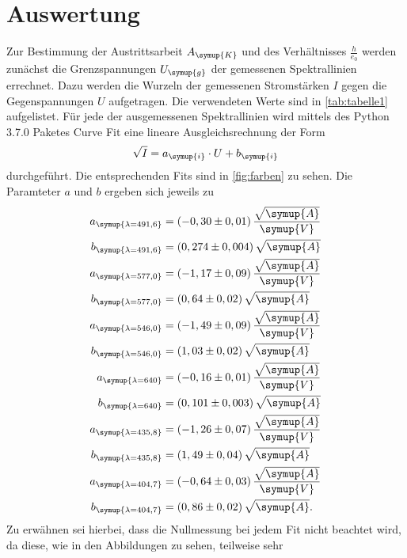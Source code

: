 \section{Auswertung}
\label{sec:Auswertung}
Zur Bestimmung der Austrittsarbeit $A_{\symup{K}}$ und des Verhältnisses $\frac{h}{e_0}$ werden zunächst die Grenzspannungen $U_{\symup{g}}$
der gemessenen Spektrallinien errechnet. Dazu werden die Wurzeln der gemessenen Stromstärken $I$ gegen die Gegenspannungen $U$ aufgetragen.
Die verwendeten Werte sind in \autoref{tab:tabelle1} aufgelistet. Für jede der ausgemessenen Spektrallinien wird mittels des Python 3.7.0 Paketes Curve Fit
eine lineare Ausgleichsrechnung der Form 
\begin{equation}
\label{eqn:ausgleich1}
  \sqrt{I} = a_{\symup{i}} \cdot U + b_{\symup{i}} 
\end{equation}
durchgeführt. Die entsprechenden Fits sind in \autoref{fig:farben} zu sehen. Die Paramteter $a$ und $b$ ergeben sich jeweils zu 
\begin{align*}
  a_{\symup{\lambda = 491,6 }} &= (-0,30 \pm 0,01) \, \frac{\sqrt{\symup{A}}}{\symup{V}} \\
  b_{\symup{\lambda = 491,6 }} &= (0,274 \pm 0,004) \, \sqrt{\symup{A}} \\
  a_{\symup{\lambda = 577,0 }} &= (-1,17 \pm 0,09) \, \frac{\sqrt{\symup{A}}}{\symup{V}} \\
  b_{\symup{\lambda = 577,0 }} &= (0,64 \pm 0,02) \,  \sqrt{\symup{A}} \\
  a_{\symup{\lambda = 546,0 }} &= (-1,49 \pm 0,09) \, \frac{\sqrt{\symup{A}}}{\symup{V}} \\
  b_{\symup{\lambda = 546,0 }} &= (1,03 \pm 0,02) \,  \sqrt{\symup{A}} \\
  a_{\symup{\lambda = 640}} &= (-0,16 \pm 0,01) \, \frac{\sqrt{\symup{A}}}{\symup{V}} \\
  b_{\symup{\lambda = 640}} &= (0,101 \pm 0,003) \,\sqrt{\symup{A}} \\
  a_{\symup{\lambda = 435,8 }} &= (-1,26 \pm 0,07) \, \frac{\sqrt{\symup{A}}}{\symup{V}} \\
  b_{\symup{\lambda = 435,8 }} &= (1,49 \pm 0,04) \,  \sqrt{\symup{A}} \\
  a_{\symup{\lambda = 404,7 }} &= (-0,64 \pm 0,03) \, \frac{\sqrt{\symup{A}}}{\symup{V}} \\
  b_{\symup{\lambda = 404,7 }} &= (0,86 \pm 0,02) \,  \sqrt{\symup{A}}. \\
\end{align*} 
Zu erwähnen sei hierbei, dass die Nullmessung bei jedem Fit nicht beachtet wird, da diese, wie in den Abbildungen zu sehen, teilweise sehr 
